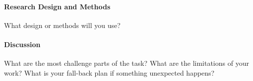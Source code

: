 \documentclass[12pt]{article}
\begin{document}
\lipsum[3]

\paragraph{Research Design and Methods}
What design or methods will you use?


\lipsum[4]

\paragraph{Discussion}
What are the most challenge parts of the task?
What are the limitations of your work? What is your fall-back plan if
something unexpected happens?

\lipsum[5]



\end{document}

